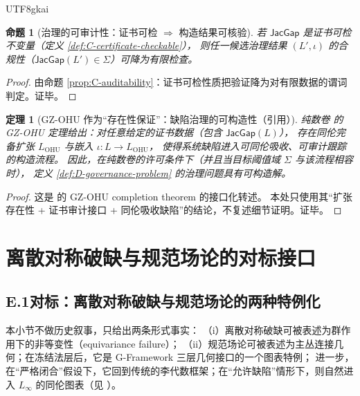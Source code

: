 \documentclass[12pt]{article}
\newtheorem{theorem}{定理}[section]
\newtheorem{proposition}{命题}[section]
\begin{document}
\begin{CJK*}{UTF8}{gkai}
\begin{proposition}[治理的可审计性：证书可检 $\Rightarrow$ 构造结果可核验]\label{prop:D-auditable}
若 $\mathsf{JacGap}$ 是证书可检不变量（定义 \ref{def:C-certificate-checkable}），
则任一候选治理结果 $(L',\iota)$ 的合规性（$\mathsf{JacGap}(L')\in\Sigma$）可降为有限检查。
\end{proposition}
\begin{proof}
由命题 \ref{prop:C-auditability}：证书可检性质把验证降为对有限数据的谓词判定。证毕。
\end{proof}

\begin{theorem}[GZ-OHU 作为“存在性保证”：缺陷治理的可构造性（引用）]\label{thm:D-ohu-governance}
纯数卷 \cite{GaoZheng2025GFramework} 的 GZ-OHU 定理给出：对任意给定的证书数据（包含 $\mathsf{JacGap}(L)$），
存在同伦完备扩张 $L_{\mathrm{OHU}}$ 与嵌入 $\iota:L\to L_{\mathrm{OHU}}$，
使得系统缺陷进入可同伦吸收、可审计跟踪的构造流程。
因此，在纯数卷的许可条件下（并且当目标阈值域 $\Sigma$ 与该流程相容时），
定义 \ref{def:D-governance-problem} 的治理问题具有可构造解。
\end{theorem}

\begin{proof}
这是 \cite{GaoZheng2025GFramework} 的 GZ-OHU completion theorem 的接口化转述。
本处只使用其“扩张存在性 + 证书审计接口 + 同伦吸收缺陷”的结论，不复述细节证明。证毕。
\end{proof}

\clearpage

\section{离散对称破缺与规范场论的对标接口}\label{app:E-parity-gauge}

\subsection{E.1\;对标：离散对称破缺与规范场论的两种特例化}\label{subsec:E-parity-gauge}

本小节不做历史叙事，只给出两条形式事实：
（i）离散对称破缺可被表述为群作用下的非等变性（equivariance failure）；
（ii）规范场论可被表述为主丛连接几何；在冻结法层后，它是 G-Framework 三层几何接口的一个图表特例；
进一步，在“严格闭合”假设下，它回到传统的李代数框架；在“允许缺陷”情形下，则自然进入 $L_\infty$ 的同伦图表（见 \cite{GaoZheng2025GFramework}）。


\end{CJK*}
\end{document}
